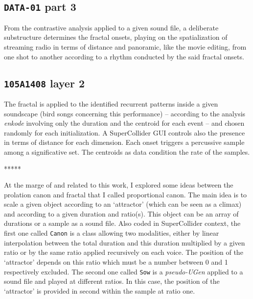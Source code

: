 \documentclass{article}
\begin{document}
\subsection*{\texttt{DATA-01} part 3 \textnormal{\cite[Section 8.4]{yx}}} \vspace{-1mm}
From the contrastive analysis \cite[Section 4.4]{yx} applied to a given sound file, a deliberate substructure determines the fractal onsets, playing on the spatialization of streaming radio in terms of distance and panoramic, like the movie editing, from one shot to another according to a rhythm conducted by the said fractal onsets. 
\vspace{-1mm}

\subsection*{\texttt{105A1408} layer 2 \textnormal{\cite[Section 8.6]{yx}}}
\vspace{-1mm}
The fractal is applied to the identified recurrent patterns inside a given soundscape (bird songs concerning this performance) -- according to the analysis \textsl{enkode} \cite[Chapter 1]{yx} involving only the duration and the centroid for each event -- and chosen randomly for each initialization. A SuperCollider GUI \cite[Figure 8.11]{yx} controls also the presence in terms of distance for each dimension. 
Each onset triggers a percussive sample among a significative set. The centroids as data condition the rate of the samples. 

\bigskip

\begin{center}
*****
\end{center}
\smallskip

At the marge of and related to this work, I explored some ideas between the prolation canon and fractal that I called proportional canon. 
The main idea is to scale a given object according to an `attractor'  (which can be seen as a climax) and according to a given duration and ratio(s).
This object can be an array of durations or a sample as a sound file.
Also coded in SuperCollider context, the first one called \texttt{Canon} \cite[Section 6.2]{yx} is a class allowing two modalities, either by linear interpolation between the total duration and this duration multiplied by a given ratio or by the same ratio applied recursively on each voice. The position of the `attractor'  depends on this ratio which must be a number between 0 and 1 respectively excluded. The second one called \texttt{Sow} \cite[Section 7.4]{yx} is a \textsl{pseudo-UGen} applied to a sound file and played at different ratios. In this case, the position of the `attractor' is provided in second within the sample at ratio one.
\end{document}
